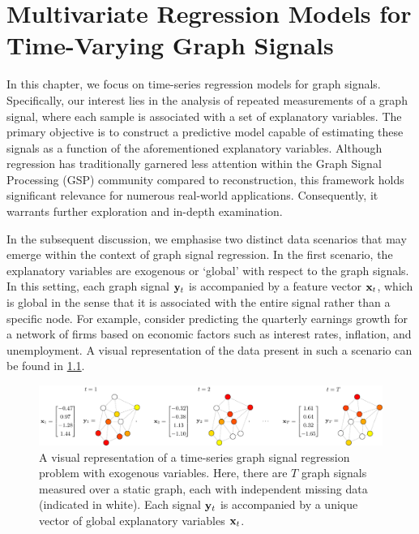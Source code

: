 \chapter{Multivariate Regression Models for Time-Varying Graph Signals}


\label{chap:kgr_rnc_2d}

In this chapter, we focus on time-series regression models for graph signals. Specifically, our interest lies in the analysis of repeated measurements of a graph signal, where each sample is associated with a set of explanatory variables. The primary objective is to construct a predictive model capable of estimating these signals as a function of the aforementioned explanatory variables. Although regression has traditionally garnered less attention within the Graph Signal Processing (GSP) community compared to reconstruction, this framework holds significant relevance for numerous real-world applications. Consequently, it warrants further exploration and in-depth examination.

In the subsequent discussion, we emphasise two distinct data scenarios that may emerge within the context of graph signal regression. In the first scenario, the explanatory variables are exogenous or `global' with respect to the graph signals. In this setting, each graph signal $\mathbf{y}_t$ is accompanied by a feature vector $\mathbf{x}_t$, which is global in the sense that it is associated with the entire signal rather than a specific node. For example, consider predicting the quarterly earnings growth for a network of firms based on economic factors such as interest rates, inflation, and unemployment. A visual representation of the data present in such a scenario can be found in \cref{fig:KGR_diagram}.


\begin{figure}[ht]
    \centering
    \includegraphics[width=\linewidth]{Figures/KGR_diagram.pdf}
    \caption[Graph signal regression with exogenous variables]{A visual representation of a time-series graph signal regression problem with exogenous variables. Here, there are $T$ graph signals measured over a static graph, each with independent missing data (indicated in white). Each signal $\mathbf{y}_t$ is accompanied by a unique vector of global explanatory variables $\mathbf{x}_t$. }
    \label{fig:KGR_diagram}
\end{figure}

